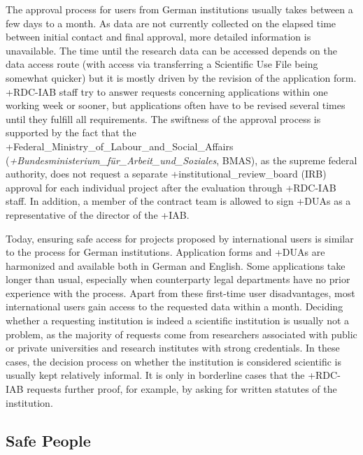 \documentclass[
]{book}
\begin{document}
The approval process for users from German institutions usually takes between a few days to a month. As data are not currently collected on the elapsed time between initial contact and final approval, more detailed information is unavailable. The time until the research data can be accessed depends on the data access route (with access via transferring a Scientific Use File being somewhat quicker) but it is mostly driven by the revision of the application form. +RDC-IAB\textbar{} staff try to answer requests concerning applications within one working week or sooner, but applications often have to be revised several times until they fulfill all requirements. The swiftness of the approval process is supported by the fact that the +Federal\_Ministry\_of\_Labour\_and\_Social\_Affairs\textbar{} (\emph{+Bundesministerium\_für\_Arbeit\_und\_Soziales\textbar{}}, BMAS), as the supreme federal authority, does not request a separate +institutional\_review\_board\textbar{} (IRB) approval for each individual project after the evaluation through +RDC-IAB\textbar{} staff. In addition, a member of the contract team is allowed to sign +DUA\textbar s as a representative of the director of the +IAB\textbar.

Today, ensuring safe access for projects proposed by international users is similar to the process for German institutions. Application forms and +DUA\textbar s are harmonized and available both in German and English. Some applications take longer than usual, especially when counterparty legal departments have no prior experience with the process. Apart from these first-time user disadvantages, most international users gain access to the requested data within a month. Deciding whether a requesting institution is indeed a scientific institution is usually not a problem, as the majority of requests come from researchers associated with public or private universities and research institutes with strong credentials. In these cases, the decision process on whether the institution is considered scientific is usually kept relatively informal. It is only in borderline cases that the +RDC-IAB\textbar{} requests further proof, for example, by asking for written statutes of the institution.

\hypertarget{safe-people}{%
\subsection{Safe People}\label{safe-people}}
\end{document}
